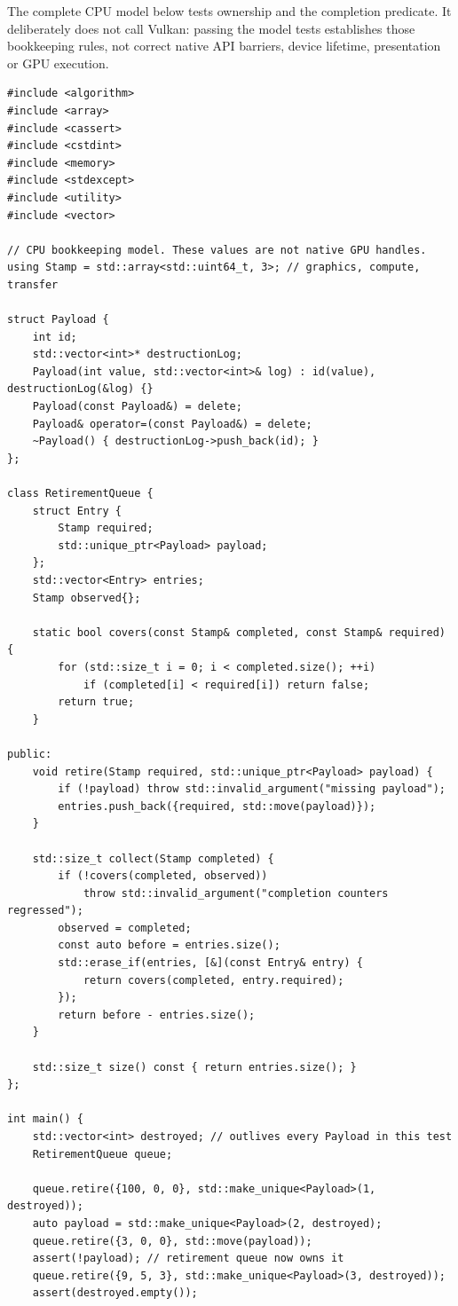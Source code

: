 The complete CPU model below tests ownership and the completion predicate. It deliberately does not call Vulkan: passing the model tests establishes those bookkeeping rules, not correct native API barriers, device lifetime, presentation or GPU execution.

\begin{verbatim}
#include <algorithm>
#include <array>
#include <cassert>
#include <cstdint>
#include <memory>
#include <stdexcept>
#include <utility>
#include <vector>

// CPU bookkeeping model. These values are not native GPU handles.
using Stamp = std::array<std::uint64_t, 3>; // graphics, compute, transfer

struct Payload {
    int id;
    std::vector<int>* destructionLog;
    Payload(int value, std::vector<int>& log) : id(value), destructionLog(&log) {}
    Payload(const Payload&) = delete;
    Payload& operator=(const Payload&) = delete;
    ~Payload() { destructionLog->push_back(id); }
};

class RetirementQueue {
    struct Entry {
        Stamp required;
        std::unique_ptr<Payload> payload;
    };
    std::vector<Entry> entries;
    Stamp observed{};

    static bool covers(const Stamp& completed, const Stamp& required) {
        for (std::size_t i = 0; i < completed.size(); ++i)
            if (completed[i] < required[i]) return false;
        return true;
    }

public:
    void retire(Stamp required, std::unique_ptr<Payload> payload) {
        if (!payload) throw std::invalid_argument("missing payload");
        entries.push_back({required, std::move(payload)});
    }

    std::size_t collect(Stamp completed) {
        if (!covers(completed, observed))
            throw std::invalid_argument("completion counters regressed");
        observed = completed;
        const auto before = entries.size();
        std::erase_if(entries, [&](const Entry& entry) {
            return covers(completed, entry.required);
        });
        return before - entries.size();
    }

    std::size_t size() const { return entries.size(); }
};

int main() {
    std::vector<int> destroyed; // outlives every Payload in this test
    RetirementQueue queue;

    queue.retire({100, 0, 0}, std::make_unique<Payload>(1, destroyed));
    auto payload = std::make_unique<Payload>(2, destroyed);
    queue.retire({3, 0, 0}, std::move(payload));
    assert(!payload); // retirement queue now owns it
    queue.retire({9, 5, 3}, std::make_unique<Payload>(3, destroyed));
    assert(destroyed.empty());


\end{verbatim}
